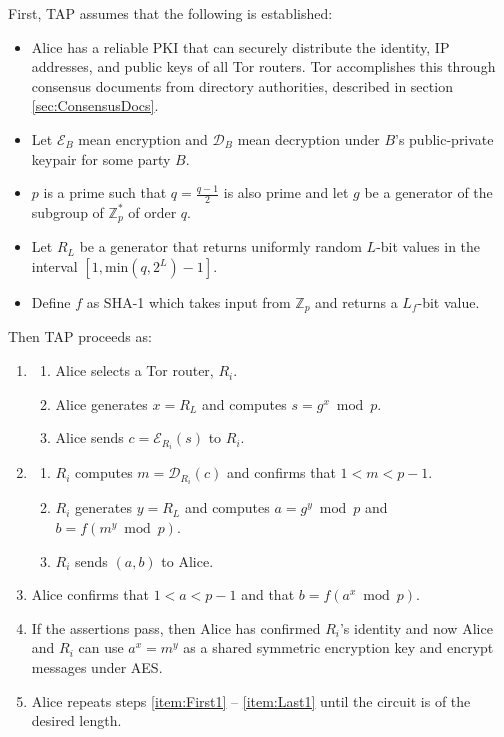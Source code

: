 First, TAP assumes that the following is established:

\begin{itemize}
	\item Alice has a reliable PKI that can securely distribute the identity, IP addresses, and public keys of all Tor routers. Tor accomplishes this through consensus documents from directory authorities, described in section \ref{sec:ConsensusDocs}.
	\item Let $ \mathcal{E}_{B} $ mean encryption and $ \mathcal{D}_{B} $ mean decryption under $ B $'s public-private keypair for some party $ B $.
	\item $ p $ is a prime such that $ q = \frac{q - 1}{2} $ is also prime and let $ g $ be a generator of the subgroup of $ \mathbb{Z}^{*}_{p} $ of order $ q $.
	\item Let $ R_{L} $ be a generator that returns uniformly random $ L $-bit values in the interval $ [1, \textrm{min}(q, 2 ^ L) - 1] $.
	\item Define $ f $ as SHA-1 which takes input from $ \mathbb{Z}_{p} $ and returns a $ L_{f} $-bit value.
\end{itemize}

Then TAP proceeds as:

\begin{enumerate}
	\item \label{item:First1}
		\begin{enumerate}
			\item Alice selects a Tor router, $ R_{i} $.
			\item Alice generates $ x = R_{L} $ and computes $ s = g ^ x \bmod{p} $.
			\item Alice sends $ c = \mathcal{E}_{R_{i}}(s) $ to $ R_{i} $.
		\end{enumerate}
	\item
		\begin{enumerate}
			\item $ R_{i} $ computes $ m = \mathcal{D}_{R_{i}}(c) $ and confirms that $ 1 < m < p - 1 $.
			\item $ R_{i} $ generates $ y = R_{L} $ and computes $ a = g ^ y \bmod{p} $ and $ b = f(m ^ y \bmod{p}) $.
			\item $ R_{i} $ sends $ (a, b) $ to Alice.
		\end{enumerate}
	\item
		Alice confirms that $ 1 < a < p - 1 $ and that $ b = f(a ^ x \bmod{p}) $.
	\item \label{item:Last1}
		If the assertions pass, then Alice has confirmed $ R_{i} $'s identity and now Alice and $ R_{i} $ can use $ a ^ x = m ^ y $ as a shared symmetric encryption key and encrypt messages under AES.
	\item 
		Alice repeats steps \ref{item:First1} -- \ref{item:Last1} until the circuit is of the desired length.
\end{enumerate}

